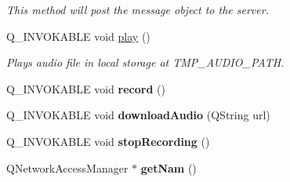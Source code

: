 \begin{DoxyCompactItemize}
\begin{DoxyCompactList}\small\item\em This method will post the message object to the server. \end{DoxyCompactList}\item 
\hypertarget{classHttpManager_a5d7a7272de96966d3bcf40c4448ed55f}{Q\-\_\-\-I\-N\-V\-O\-K\-A\-B\-L\-E void \hyperlink{classHttpManager_a5d7a7272de96966d3bcf40c4448ed55f}{play} ()}\label{classHttpManager_a5d7a7272de96966d3bcf40c4448ed55f}

\begin{DoxyCompactList}\small\item\em Plays audio file in local storage at T\-M\-P\-\_\-\-A\-U\-D\-I\-O\-\_\-\-P\-A\-T\-H. \end{DoxyCompactList}\item 
\hypertarget{classHttpManager_adc162b753bd1ca62d74672e96a4775e2}{Q\-\_\-\-I\-N\-V\-O\-K\-A\-B\-L\-E void {\bfseries record} ()}\label{classHttpManager_adc162b753bd1ca62d74672e96a4775e2}

\item 
\hypertarget{classHttpManager_a9baefea195b0e488348adeb82a0d80e1}{Q\-\_\-\-I\-N\-V\-O\-K\-A\-B\-L\-E void {\bfseries download\-Audio} (Q\-String url)}\label{classHttpManager_a9baefea195b0e488348adeb82a0d80e1}

\item 
\hypertarget{classHttpManager_a80653bae4b0a66f9eda4c372d144c1be}{Q\-\_\-\-I\-N\-V\-O\-K\-A\-B\-L\-E void {\bfseries stop\-Recording} ()}\label{classHttpManager_a80653bae4b0a66f9eda4c372d144c1be}

\item 
\hypertarget{classHttpManager_a4b5be6b80df7be50e135181ded11e5b5}{Q\-Network\-Access\-Manager $\ast$ {\bfseries get\-Nam} ()}\label{classHttpManager_a4b5be6b80df7be50e135181ded11e5b5}

\end{DoxyCompactItemize}
